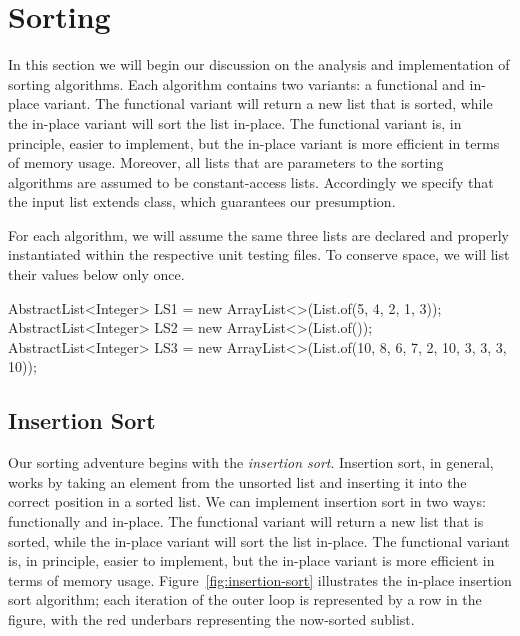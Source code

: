 \section{Sorting}
In this section we will begin our discussion on the analysis and implementation of sorting algorithms. Each algorithm contains two variants: a functional and in-place variant. The functional variant will return a new list that is sorted, while the in-place variant will sort the list in-place. The functional variant is, in principle, easier to implement, but the in-place variant is more efficient in terms of memory usage. Moreover, all lists that are parameters to the sorting algorithms are assumed to be constant-access lists. Accordingly we specify that the input list extends  class, which guarantees our presumption.

For each algorithm, we will assume the same three lists are declared and properly instantiated within the respective unit testing files. To conserve space, we will list their values below only once.

\begin{verbnobox}[\footnotesize]
AbstractList<Integer> LS1 = 
  new ArrayList<>(List.of(5, 4, 2, 1, 3));
AbstractList<Integer> LS2 = 
  new ArrayList<>(List.of());
AbstractList<Integer> LS3 = 
  new ArrayList<>(List.of(10, 8, 6, 7, 2, 10, 3, 3, 3, 10));
\end{verbnobox}

\subsection*{Insertion Sort}
Our sorting adventure begins with the \textit{insertion sort}. Insertion sort, in general, works by taking an element from the unsorted list and inserting it into the correct position in a sorted list. We can implement insertion sort in two ways: functionally and in-place. The functional variant will return a new list that is sorted, while the in-place variant will sort the list in-place. The functional variant is, in principle, easier to implement, but the in-place variant is more efficient in terms of memory usage. Figure~\ref{fig:insertion-sort} illustrates the in-place insertion sort algorithm; each iteration of the outer loop is represented by a row in the figure, with the red underbars representing the now-sorted sublist.

